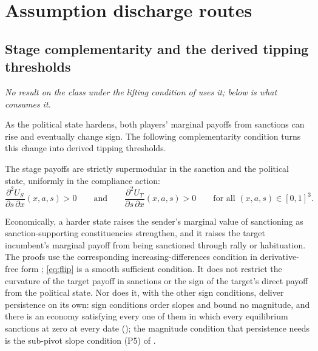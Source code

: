 \section{Assumption discharge routes}
\label{app:dischargers}

\subsection{Stage complementarity and the derived tipping thresholds}
\label{sec:flip}

\emph{No result on the class under the lifting condition of
 uses it;  below is what consumes it.}

As the political state hardens, both players' marginal payoffs from
sanctions can rise and eventually change sign. The following
complementarity condition turns this change into derived tipping
thresholds.

\begin{assumption}
\label{ass:flip}
The stage payoffs are strictly supermodular in the sanction and the
political state, uniformly in the compliance action:
\begin{equation}
\frac{\partial^2 U_S}{\partial s\,\partial x}(x,a,s)>0
\qquad\text{and}\qquad
\frac{\partial^2 U_T}{\partial s\,\partial x}(x,a,s)>0
\qquad\text{for all }(x,a,s)\in[0,1]^3.
\label{eq:flip}
\end{equation}
\end{assumption}

Economically, a harder state raises the sender's marginal value of
sanctioning as sanction-supporting constituencies strengthen, and it
raises the target incumbent's marginal payoff from being sanctioned
through rally or habituation. The proofs use the corresponding
increasing-differences condition in derivative-free form \citep{topkis1998};
\eqref{eq:flip} is a smooth sufficient condition. It does not restrict
the curvature of the target payoff in sanctions or the sign of the
target's direct payoff from the political state. Nor does it, with the
other sign conditions, deliver persistence on its own: sign conditions
order slopes and bound no magnitude, and there is an economy satisfying
every one of them in which every equilibrium sanctions at zero at every
date (); the magnitude
condition that persistence needs is the sub-pivot slope condition (P5) of
.

